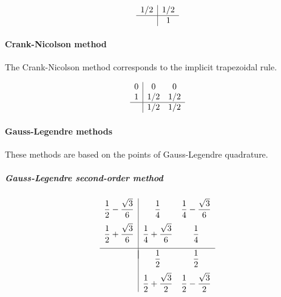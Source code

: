 \begin{equation}
	\begin{array}{c|c}
		1/2 & 1/2 \\ \hline
		    & 1 
	\end{array}
	\label{eq::implicit_midpoint}
\end{equation}

\paragraph{Crank-Nicolson method}
The Crank-Nicolson method corresponds to the implicit trapezoidal rule.

\begin{equation}
	\begin{array}{c|cc}
		0 & 0   & 0   \\
		1 & 1/2 & 1/2 \\ \hline
		  & 1/2 & 1/2
	\end{array}
	\label{eq::crank-nicolson}
\end{equation}

\paragraph{Gauss-Legendre methods}
These methods are based on the points of Gauss-Legendre quadrature.

\subparagraph{Gauss-Legendre second-order method}
\begin{equation}
	\begin{array}{c|cc}
		\dfrac{1}{2}-\dfrac{\sqrt3}{6} &
		   \dfrac{1}{4} &
		       \dfrac{1}{4}-\dfrac{\sqrt3}{6}
		           \\[1em]
		\dfrac{1}{2}+\dfrac{\sqrt3}{6} & 
		    \dfrac{1}{4}+\dfrac{\sqrt3}{6} &
		        \dfrac{1}{4}
		            \\[1em]
		\hline\\[-1em]
		    & \dfrac{1}{2}
		    & \dfrac{1}{2}
		    \\[1em]
		    & \dfrac{1}{2}+\dfrac{\sqrt{3}}{2}
		    & \dfrac{1}{2}-\dfrac{\sqrt{3}}{2}
	\end{array}
	\label{eq::gauss-legendre_2}
\end{equation}

